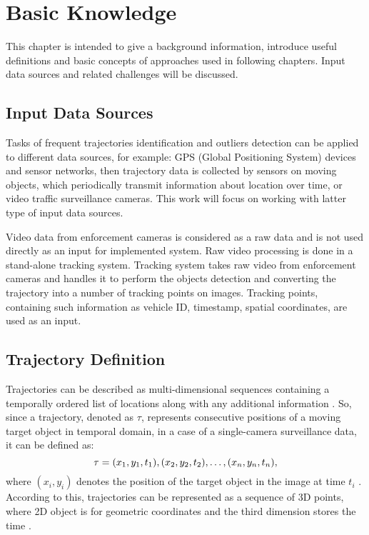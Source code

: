 \chapter{Basic Knowledge}
\label{ch:Basic Knowledge}

This chapter is intended to give a background information, introduce useful definitions and basic concepts of approaches used in following chapters. Input data sources and related challenges will be discussed.

\section{Input Data Sources}
Tasks of frequent trajectories identification and outliers detection can be applied to different data sources, for example: GPS (Global Positioning System) devices and sensor networks, then trajectory data is collected by sensors on moving objects, which periodically transmit information about location over time, or video traffic surveillance cameras. This work will focus on working with latter type of input data sources.

Video data from enforcement cameras is considered as a raw data and is not used directly as an input for implemented system. Raw video processing is done in a stand-alone tracking system. Tracking system takes raw video from enforcement cameras and handles it to perform the objects detection and converting the trajectory into a number of tracking points on images. Tracking points, containing such information as vehicle ID, timestamp, spatial coordinates, are used as an input.

\section{Trajectory Definition}

Trajectories can be described as multi-dimensional sequences containing a temporally ordered list of locations along with any additional information \cite{article:1_survey_stdm}. So, since a trajectory, denoted as $\tau$, represents consecutive positions of a moving target object in temporal domain, in a case of a single-camera surveillance data, it can be defined as:
\begin{equation}
	\tau={(x_1, y_1, t_1), (x_2, y_2, t_2), \ldots, (x_n, y_n, t_n)}\\[3pt],
\end{equation}
where $(x_i, y_i)$ denotes the position of the target object in the image at time $t_i$ \cite{article:5_survey_tbsa}. According to this, trajectories can be represented as a sequence of 3D points, where 2D object is for geometric coordinates and the third dimension stores the time \cite{article:25_dhr_mvt_eesd}.

